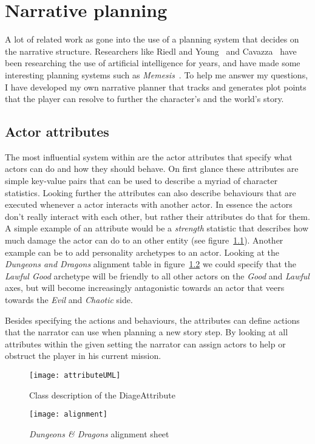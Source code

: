 \chapter{Narrative planning}
\label{ch:planning}
A lot of related work as gone into the use of a planning system that decides on the narrative structure.
Researchers like Riedl and Young~\cite{Riedl03character-focusednarrative, Riedl:2003:MIU:860575.860694, Riedl:2004:IPM:1018409.1018753} and Cavazza~\cite{Cavazza:2002:CIS:630325.630747} have been researching the use of artificial intelligence for years, and have made some interesting planning systems such as \textit{Memesis}~\cite{young2003towards}.
To help me answer my questions, I have developed my own narrative planner that tracks and generates plot points that the player can resolve to further the character's and the world's story.

\section{Actor attributes}
The most influential system within \diage are the actor attributes that specify what actors can do and how they should behave. 
On first glance these attributes are simple key-value pairs that can be used to describe a myriad of character statistics. 
Looking further the attributes can also describe behaviours that are executed whenever a actor interacts with another actor.
In essence the actors don't really interact with each other, but rather their attributes do that for them.
A simple example of an attribute would be a \textit{strength} statistic that describes how much damage the actor can do to an other entity (see figure~\ref{fig:attributeUML}).
Another example can be to add personality archetypes to an actor.
Looking at the \textit{Dungeons and Dragons} alignment table in figure~\ref{fig:dnd} we could specify that the \textit{Lawful Good} archetype will be friendly to all other actors on the \textit{Good} and \textit{Lawful} axes, but will become increasingly antagonistic towards an actor that veers towards the \textit{Evil} and \textit{Chaotic} side.

Besides specifying the actions and behaviours, the attributes can define actions that the narrator can use when planning a new story step. By looking at all attributes within the given setting the narrator can assign actors to help or obstruct the player in his current mission.
\begin{figure}[p]
 \texttt{[image: attributeUML]}
 \caption{Class description of the DiageAttribute}\label{fig:attributeUML}
\end{figure}
\begin{figure}[p]
	\texttt{[image: alignment]}
	\caption{\textit{Dungeons \& Dragons} alignment sheet}\label{fig:dnd}
\end{figure}

